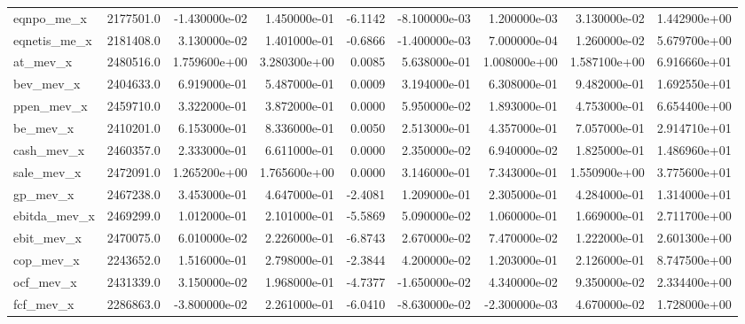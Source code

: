 \documentclass[12pt]{article}
\begin{document}
\begin{landscape}
\begin{longtable}{|l|r|r|r|r|r|r|r|r|}
eqnpo\_me\_x              &  2177501.0 & -1.430000e-02 &  1.450000e-01 &     -6.1142 & -8.100000e-03 &  1.200000e-03 &  3.130000e-02 &  1.442900e+00 \\
eqnetis\_me\_x            &  2181408.0 &  3.130000e-02 &  1.401000e-01 &     -0.6866 & -1.400000e-03 &  7.000000e-04 &  1.260000e-02 &  5.679700e+00 \\
at\_mev\_x                &  2480516.0 &  1.759600e+00 &  3.280300e+00 &      0.0085 &  5.638000e-01 &  1.008000e+00 &  1.587100e+00 &  6.916660e+01 \\
bev\_mev\_x               &  2404633.0 &  6.919000e-01 &  5.487000e-01 &      0.0009 &  3.194000e-01 &  6.308000e-01 &  9.482000e-01 &  1.692550e+01 \\
ppen\_mev\_x              &  2459710.0 &  3.322000e-01 &  3.872000e-01 &      0.0000 &  5.950000e-02 &  1.893000e-01 &  4.753000e-01 &  6.654400e+00 \\
be\_mev\_x                &  2410201.0 &  6.153000e-01 &  8.336000e-01 &      0.0050 &  2.513000e-01 &  4.357000e-01 &  7.057000e-01 &  2.914710e+01 \\
cash\_mev\_x              &  2460357.0 &  2.333000e-01 &  6.611000e-01 &      0.0000 &  2.350000e-02 &  6.940000e-02 &  1.825000e-01 &  1.486960e+01 \\
sale\_mev\_x              &  2472091.0 &  1.265200e+00 &  1.765600e+00 &      0.0000 &  3.146000e-01 &  7.343000e-01 &  1.550900e+00 &  3.775600e+01 \\
gp\_mev\_x                &  2467238.0 &  3.453000e-01 &  4.647000e-01 &     -2.4081 &  1.209000e-01 &  2.305000e-01 &  4.284000e-01 &  1.314000e+01 \\
ebitda\_mev\_x            &  2469299.0 &  1.012000e-01 &  2.101000e-01 &     -5.5869 &  5.090000e-02 &  1.060000e-01 &  1.669000e-01 &  2.711700e+00 \\
ebit\_mev\_x              &  2470075.0 &  6.010000e-02 &  2.226000e-01 &     -6.8743 &  2.670000e-02 &  7.470000e-02 &  1.222000e-01 &  2.601300e+00 \\
cop\_mev\_x               &  2243652.0 &  1.516000e-01 &  2.798000e-01 &     -2.3844 &  4.200000e-02 &  1.203000e-01 &  2.126000e-01 &  8.747500e+00 \\
ocf\_mev\_x               &  2431339.0 &  3.150000e-02 &  1.968000e-01 &     -4.7377 & -1.650000e-02 &  4.340000e-02 &  9.350000e-02 &  2.334400e+00 \\
fcf\_mev\_x               &  2286863.0 & -3.800000e-02 &  2.261000e-01 &     -6.0410 & -8.630000e-02 & -2.300000e-03 &  4.670000e-02 &  1.728000e+00 \\

\end{longtable}
\end{landscape}
\end{document}
